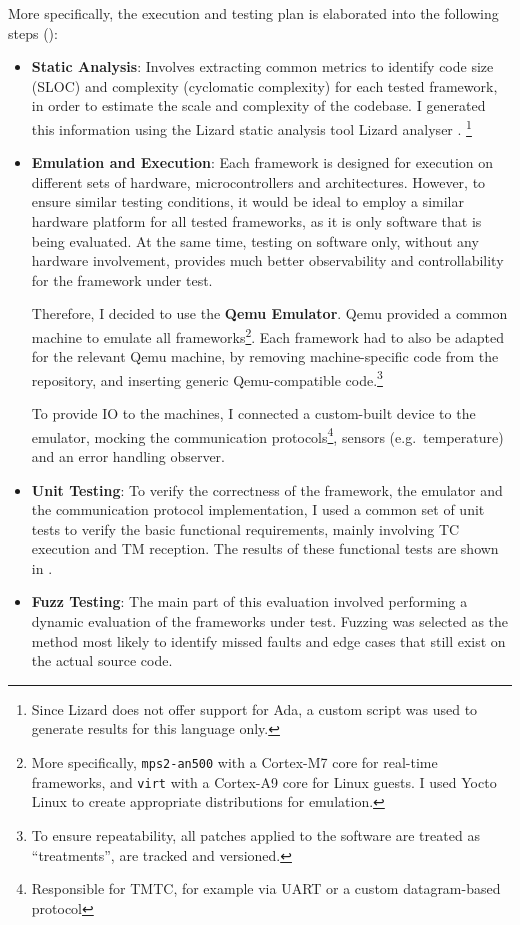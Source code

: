 \documentclass[a4paper,nobib,justified,final]{tufte-book}
\begin{document}
More specifically, the execution and testing plan is elaborated into the following steps ():
\begin{itemize}
	\item \textbf{Static Analysis}: Involves extracting common metrics to identify code size (\acs{SLOC}) and complexity (cyclomatic complexity) for each tested framework, in order to estimate the scale and complexity of the codebase. I generated this information using the Lizard static analysis tool Lizard analyser \autocite{yinLizardExtensibleCyclomatic2019}.%
	\footnote{Since Lizard does not offer support for Ada, a custom script was used to generate results for this language only.}
	\item \textbf{Emulation and Execution}: Each framework is designed for execution on different sets of hardware, microcontrollers and architectures. However, to ensure similar testing conditions, it would be ideal to employ a similar hardware platform for all tested frameworks, as it is only software that is being evaluated. At the same time, testing on software only, without any hardware involvement, provides much better observability and controllability for the framework under test.
	
	Therefore, I decided to use the \textbf{Qemu Emulator}. Qemu provided a common machine to emulate all frameworks\footnote{More specifically, \texttt{mps2-an500} with a Cortex-M7 core for real-time frameworks, and \texttt{virt} with a Cortex-A9 core for Linux guests. I used Yocto Linux to create appropriate distributions for emulation.}. Each framework had to also be adapted for the relevant Qemu machine, by removing machine-specific code from the repository, and inserting generic Qemu-compatible code.\footnote{To ensure repeatability, all patches applied to the software are treated as ``treatments'', are tracked and versioned.}

	To provide \ac{IO} to the machines, I connected a custom-built device to the emulator, mocking the communication protocols\footnote{Responsible for \ac{TMTC}, for example via \acs{UART} or a custom datagram-based protocol}, sensors (e.g.~temperature) and an error handling observer.
	\item \textbf{Unit Testing}: To verify the correctness of the framework, the emulator and the communication protocol implementation, I used a common set of unit tests to verify the basic functional requirements, mainly involving \acs{TC} execution and \acs{TM} reception. The results of these functional tests are shown in .
	\item \textbf{Fuzz Testing}:
	The main part of this evaluation involved performing a dynamic evaluation of the frameworks under test. Fuzzing was selected as the method most likely to identify missed faults and edge cases that still exist on the actual source code.


\end{itemize}
\end{document}
